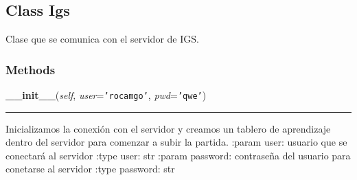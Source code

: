 
\subsection{Class Igs}

    \label{src:igs:Igs}

Clase que se comunica con el servidor de IGS.


  \subsubsection{Methods}

    \label{src:igs:Igs:__init__}

    \vspace{0.5ex}

\hspace{.8\funcindent}\begin{boxedminipage}{\funcwidth}

    \raggedright \textbf{\_\_init\_\_}(\textit{self}, \textit{user}={\tt \texttt{'}\texttt{rocamgo}\texttt{'}}, \textit{pwd}={\tt \texttt{'}\texttt{qwe}\texttt{'}})

    \vspace{-1.5ex}

    \rule{\textwidth}{0.5\fboxrule}
\setlength{\parskip}{2ex}

Inicializamos la conexión con el servidor y creamos un tablero de
aprendizaje dentro del servidor para comenzar a subir la partida.
:param user: usuario que se conectará al servidor
:type user: str
:param password: contraseña del usuario para conetarse al servidor
:type password: str
\setlength{\parskip}{1ex}
    \end{boxedminipage}

    \label{src:igs:Igs:add_stone}

